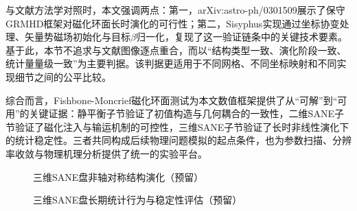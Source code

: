与文献方法学对照时，本文强调两点：第一，arXiv:astro-ph/0301509展示了保守GRMHD框架对磁化环面长时演化的可行性；第二，Sisyphus实现通过坐标协变处理、矢量势磁场初始化与目标$\beta$归一化，复现了这一验证链条中的关键技术要素。基于此，本节不追求与文献图像逐点重合，而以“结构类型一致、演化阶段一致、统计量量级一致”为主要判据。该判据更适用于不同网格、不同坐标映射和不同实现细节之间的公平比较。

综合而言，Fishbone-Moncrief磁化环面测试为本文数值框架提供了从“可解”到“可用”的关键证据：静平衡子节验证了初值构造与几何耦合的一致性，二维SANE子节验证了磁化注入与输运机制的可控性，三维SANE子节验证了长时非线性演化下的统计稳定性。三者共同构成后续物理问题模拟的起点条件，也为参数扫描、分辨率收敛与物理机理分析提供了统一的实验平台。

\begin{figure}[htbp]
	\centering
	\caption{三维SANE盘非轴对称结构演化（预留）}
	\label{fig:fm-3d-sane-structure-placeholder}
\end{figure}

\begin{figure}[htbp]
	\centering
	\caption{三维SANE盘长期统计行为与稳定性评估（预留）}
	\label{fig:fm-3d-sane-timeseries-placeholder}
\end{figure}